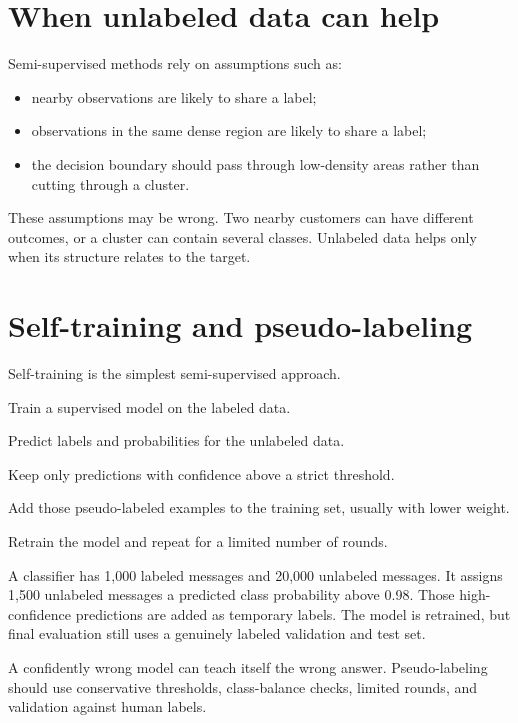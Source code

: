 \section{When unlabeled data can help}

Semi-supervised methods rely on assumptions such as:

\begin{itemize}
  \item nearby observations are likely to share a label;
  \item observations in the same dense region are likely to share a label;
  \item the decision boundary should pass through low-density areas rather than cutting through a cluster.
\end{itemize}

These assumptions may be wrong. Two nearby customers can have different outcomes, or a cluster can contain several classes. Unlabeled data helps only when its structure relates to the target.

\section{Self-training and pseudo-labeling}

Self-training is the simplest semi-supervised approach.

\begin{mlsteps}
  \item Train a supervised model on the labeled data.
  \item Predict labels and probabilities for the unlabeled data.
  \item Keep only predictions with confidence above a strict threshold.
  \item Add those pseudo-labeled examples to the training set, usually with lower weight.
  \item Retrain the model and repeat for a limited number of rounds.
\end{mlsteps}

\begin{workedexample}
A classifier has 1,000 labeled messages and 20,000 unlabeled messages. It assigns 1,500 unlabeled messages a predicted class probability above 0.98. Those high-confidence predictions are added as temporary labels. The model is retrained, but final evaluation still uses a genuinely labeled validation and test set.
\end{workedexample}

\begin{pitfall}
A confidently wrong model can teach itself the wrong answer. Pseudo-labeling should use conservative thresholds, class-balance checks, limited rounds, and validation against human labels.
\end{pitfall}

